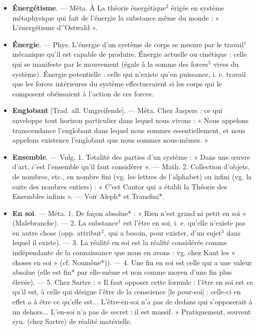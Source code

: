 \begin{itemize}[leftmargin=1cm, label=, itemsep=1pt]
\item {\bf Énergétisme}. — Méta. À La théorie
énergétique$^2$ érigée en système métaphysique qui fait de l'énergie la
substance même du monde : « L’énergétisme d’'Ostwald ».

\item {\bf Énergie}. — Phys. L'énergie d'un système de corps se mesure par le
travail$^1$ mécanique qu’il est capable
de produire. Énergie actuelle ou
cinétique : celle qui se manifeste par
le mouvement (égale à la somme
des forces$^5$ vives du système).
Énergie potentielle : celle qui n'existe
qu’en puissance, i. e. travail que les
forces intérieures du système effectueraient si les corps qui le composent obéissaient à l'action de ces
forces.

\item {\bf Englobant} [Trad. all. Umgreifende]. —
Méta. Chez Jaspers : ce qui enveloppe tout horizon particulier dans
lequel nous vivons : « Nous appelons
transcendance l’englobant dans lequel
nous sommes essentiellement, et
nous appelons existence l’englobant
que nous sommes nous-mêmes. »

\item {\bf Ensemble}. — Vulg. 1. Totalité des
parties d'un système : « Dans une
œuvre d'art, c’est l’ensemble qu'il
faut considérer ». — Math. 2. Collection d’objets, de nombres, etc., en
nombre fini (vg. les lettres de l’alphabet) ou infini (vg. la suite des
nombres entiers) : « C’est Cantor qui
a établi la Théorie des Ensembles
infinis ». — Voir Aleph* et Transfini*.

\item {\bf En soi}. — Méta. 1. De façon absolue* :
« Rien n'est grand ni petit en soi »
(Malebranche). — 2. La substance$^1$
est l'être en soi, i. e. qu’elle n'existe
pas en autre chose (opp. attribut$^2$,
qui a besoin, pour exister, d’un
sujet$^3$ dans lequel il existe). — 3.
La réalité en soi est la réalité considérée comme indépendante de la
connaissance que nous en avons :
vg. chez Kant les « choses en soi »
(cf. Noumène*)). — 4. Une fin en soi
est celle qui a une valeur absolue
(elle est fin* par elle-même et non
comme moyen d’une fin plus élevée).
— 5. Chez Sartre : « Il faut opposer
cette formule : l'être en soi est ce
qu’il est, à celle qui désigne l'être
de la conscience [le pour-soi] : celle-ci
en effet a à étre ce qu’elle est... L'être-en-soi n’a pas de dedans qui s’opposerait à un dehors... L'en-soi n’a pas
de secret : il est massif. » Pratiquement, souvent syn. (chez Sartre) de
réalité matérielle.


\end{itemize}
